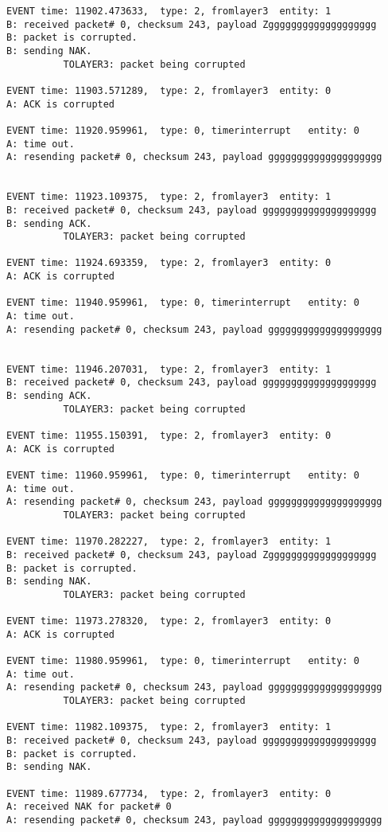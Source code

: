 \documentclass[12pt]{article}
\begin{document}
\begin{Verbatim}[frame=single, rulecolor=\color{cyan}, label=10 messages ACKed correctly]
EVENT time: 11902.473633,  type: 2, fromlayer3  entity: 1
B: received packet# 0, checksum 243, payload Zggggggggggggggggggg
B: packet is corrupted.
B: sending NAK.
          TOLAYER3: packet being corrupted

EVENT time: 11903.571289,  type: 2, fromlayer3  entity: 0
A: ACK is corrupted

EVENT time: 11920.959961,  type: 0, timerinterrupt   entity: 0
A: time out. 
A: resending packet# 0, checksum 243, payload gggggggggggggggggggg


EVENT time: 11923.109375,  type: 2, fromlayer3  entity: 1
B: received packet# 0, checksum 243, payload gggggggggggggggggggg
B: sending ACK.
          TOLAYER3: packet being corrupted

EVENT time: 11924.693359,  type: 2, fromlayer3  entity: 0
A: ACK is corrupted

EVENT time: 11940.959961,  type: 0, timerinterrupt   entity: 0
A: time out. 
A: resending packet# 0, checksum 243, payload gggggggggggggggggggg


EVENT time: 11946.207031,  type: 2, fromlayer3  entity: 1
B: received packet# 0, checksum 243, payload gggggggggggggggggggg
B: sending ACK.
          TOLAYER3: packet being corrupted

EVENT time: 11955.150391,  type: 2, fromlayer3  entity: 0
A: ACK is corrupted

EVENT time: 11960.959961,  type: 0, timerinterrupt   entity: 0
A: time out. 
A: resending packet# 0, checksum 243, payload gggggggggggggggggggg
          TOLAYER3: packet being corrupted

EVENT time: 11970.282227,  type: 2, fromlayer3  entity: 1
B: received packet# 0, checksum 243, payload Zggggggggggggggggggg
B: packet is corrupted.
B: sending NAK.
          TOLAYER3: packet being corrupted

EVENT time: 11973.278320,  type: 2, fromlayer3  entity: 0
A: ACK is corrupted

EVENT time: 11980.959961,  type: 0, timerinterrupt   entity: 0
A: time out. 
A: resending packet# 0, checksum 243, payload gggggggggggggggggggg
          TOLAYER3: packet being corrupted

EVENT time: 11982.109375,  type: 2, fromlayer3  entity: 1
B: received packet# 0, checksum 243, payload gggggggggggggggggggg
B: packet is corrupted.
B: sending NAK.

EVENT time: 11989.677734,  type: 2, fromlayer3  entity: 0
A: received NAK for packet# 0
A: resending packet# 0, checksum 243, payload gggggggggggggggggggg


\end{Verbatim}
\end{document}
